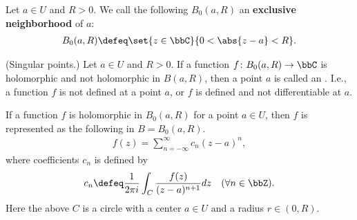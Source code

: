 \documentclass[openany, a4paper, oneside]{jsbook}
\begin{document}
Let $a \in U$ and $R > 0$.
We call the following $B_0 (a, R)$ an \textbf{exclusive neighborhood} of $a$:
\begin{align}
 B_0 (a, R)
 \defeq
 \set{z \in \bbC}{ 0 < \abs{z - a} < R}.
\end{align}
\begin{defn}\textup{(Singular points.)}
 Let $a \in U$ and $R > 0$.
 If a function $f \colon B_0 (a, R) \to \bbC$ is holomorphic and not holomorphic in $B (a, R)$,
 then a point $a$ is called an .
 I.e., a function $f$ is not defined at a point $a$, or $f$ is defined and not differentiable at $a$.
\end{defn}
\begin{thm}
 If a function $f$ is holomorphic in $B_0 (a, R)$ for a point $a \in U$, then
 $f$ is represented as the following  in $B = B_0 (a, R)$.
 \begin{align}
  f (z)
  =
  \sum_{n= - \infty}^{\infty} c_n (z-a)^n,
 \end{align}
 where coefficients $c_n$ is defined by
 \begin{align}
  c_n
  \defeq
  \frac{1}{2 \pi i} \int_C \frac{f (z)}{(z - a)^{n+1}} dz \quad (\forall n \in \bbZ).
 \end{align}
 Here the above $C$ is a circle with a center $a \in U$ and a radius $r \in (0, R)$.
\end{thm}
\end{document}
